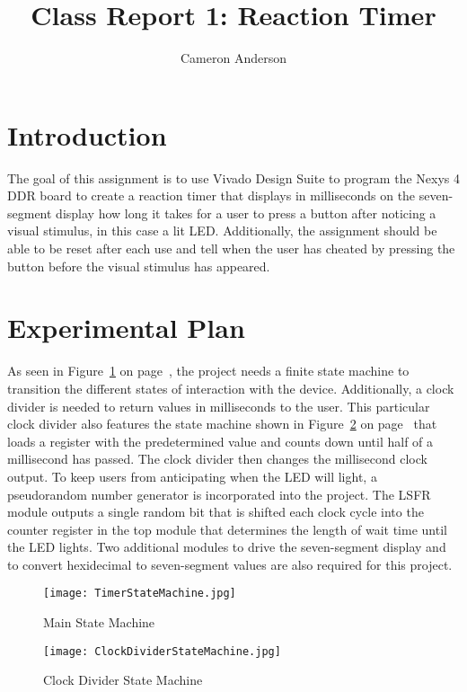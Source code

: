 \documentclass{article}
\author{Cameron Anderson}
\title{Class Report 1: Reaction Timer}
\begin{document}
\maketitle

\section{Introduction}
The goal of this assignment is to use Vivado Design Suite to program the Nexys 4 DDR board to create a reaction timer that displays in milliseconds on the seven-segment display how long it takes for a user to press a button after noticing a visual stimulus, in this case a lit LED. Additionally, the assignment should be able to be reset after each use and tell when the user has cheated by pressing the button before the visual stimulus has appeared. 

\section{Experimental Plan}
As seen in Figure~\ref{fig:TimerStateMachine} on page~\pageref{fig:TimerStateMachine}, the project needs a finite state machine to transition the different states of interaction with the device. Additionally, a clock divider is needed to return values in milliseconds to the user. This particular clock divider also features the state machine shown in Figure~\ref{fig:ClockDividerStateMachine} on page~\pageref{fig:ClockDividerStateMachine} that loads a register with the predetermined value and counts down until half of a millisecond has passed. The clock divider then changes the millisecond clock output. To keep users from anticipating when the LED will light, a pseudorandom number generator is incorporated into the project. The LSFR module outputs a single random bit that is shifted each clock cycle into the counter register in the top module that determines the length of wait time until the LED lights. Two additional modules to drive the seven-segment display and to convert hexidecimal to seven-segment values are also required for this project. 

\begin{figure} [h]
\begin{center}
\caption{Main State Machine}\label{fig:TimerStateMachine}
\texttt{[image: TimerStateMachine.jpg]}
\end{center}
\end{figure}

\begin{figure} [h]
\begin{center}
\caption{Clock Divider State Machine}\label{fig:ClockDividerStateMachine}
\texttt{[image: ClockDividerStateMachine.jpg]}
\end{center}
\end{figure}
\end{document}
